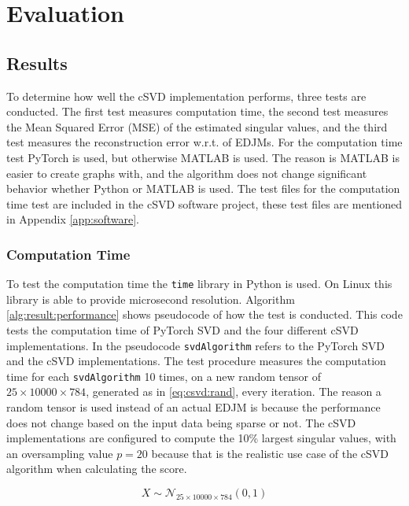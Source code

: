 \chapter{Evaluation}

\section{Results}

To determine how well the cSVD implementation performs, three tests are conducted. The first test measures computation time, the second test measures the Mean Squared Error (MSE) of the estimated singular values, and the third test measures the reconstruction error w.r.t. of EDJMs. For the computation time test PyTorch is used, but otherwise MATLAB is used. The reason is MATLAB is easier to create graphs with, and the algorithm does not change significant behavior whether Python or MATLAB is used. The test files for the computation time test are included in the cSVD software project, these test files are mentioned in Appendix \ref{app:software}.

\subsection*{Computation Time}

To test the computation time the \texttt{time} library in Python is used. On Linux this library is able to provide microsecond resolution. Algorithm \ref{alg:result:performance} shows pseudocode of how the test is conducted. This code tests the computation time of PyTorch SVD and the four different cSVD implementations. In the pseudocode \texttt{svdAlgorithm} refers to the PyTorch SVD and the cSVD implementations. The test procedure measures the computation time for each \texttt{svdAlgorithm} 10 times, on a new random tensor of $25 \times 10000 \times 784$, generated as in \eqref{eq:csvd:rand}, every iteration. The reason a random tensor is used instead of an actual EDJM is because the performance does not change based on the input data being sparse or not. The cSVD implementations are configured to compute the 10\% largest singular values, with an oversampling value $p=20$ because that is the realistic use case of the cSVD algorithm when calculating the score.

\begin{equation}
  \label{eq:csvd:rand}
  X \sim \mathcal{N}_{25 \times 10000 \times 784}(0, 1)
\end{equation}

